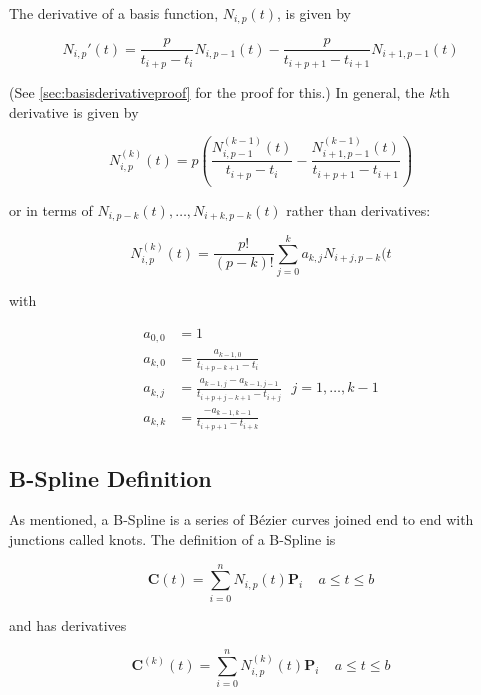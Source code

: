 The derivative of a basis function, $N_{i,p}(t)$, is given by

\begin{equation}
\label{eqn:basisderivative}
N_{i,p}'(t) = \frac{p}{t_{i+p} - t_i} N_{i,p-1}(t) - \frac{p}{t_{i+p+1} - t_{i+1}} N_{i+1,p-1}(t)
\end{equation}

(See \cref{sec:basisderivativeproof} for the proof for this.) In general, the $k$th derivative is given by

\begin{equation}
\label{eqn:basisder1}
	N_{i,p}^{(k)}(t) = p \left( \frac{N_{i,p-1}^{(k-1)}(t)}{t_{i+p} - t_i} - \frac{N_{i+1,p-1}^{(k-1)}(t)}{t_{i+p+1} - t_{i+1}} \right)
\end{equation}

or in terms of $N_{i,p-k}(t), \ldots, N_{i+k,p-k}(t)$ rather than derivatives:

\begin{equation}
\label{eqn:basisder2}
	N_{i,p}^{(k)}(t) = \frac{p!}{(p-k)!} \sum^k_{j=0} a_{k,j} N_{i+j,p-k}(t
\end{equation}

with

\begin{align}
a_{0,0} &= 1\\
a_{k,0} &= \frac{a_{k-1,0}}{t_{i+p-k+1} - t_i}\\
a_{k,j} &= \frac{a_{k-1,j} - a_{k-1,j-1}}{t_{i+p+j-k+1} - t_{i+j} } ~~~ j=1,\ldots,k-1\\
a_{k,k} &= \frac{-a_{k-1,k-1}}{t_{i+p+1} - t_{i+k} }
\end{align}


\subsection{B-Spline Definition}
As mentioned, a B-Spline is a series of Bézier curves joined end to end with junctions called knots.  The definition of a B-Spline is

\begin{equation} \textbf{C}(t) = \sum^n_{i=0}N_{i,p}(t) \textbf{P}_i~~~~~a\leq t \leq b \end{equation}

and has derivatives

\begin{equation} \textbf{C}^{(k)}(t) = \sum^n_{i=0}N^{(k)}_{i,p}(t) \textbf{P}_i~~~~~a\leq t \leq b \end{equation}

